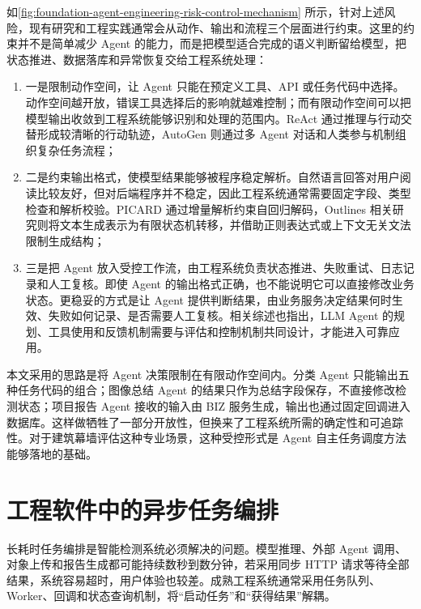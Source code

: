 如\cref{fig:foundation-agent-engineering-risk-control-mechanism} 所示，针对上述风险，现有研究和工程实践通常会从动作、输出和流程三个层面进行约束。这里的约束并不是简单减少 Agent 的能力，而是把模型适合完成的语义判断留给模型，把状态推进、数据落库和异常恢复交给工程系统处理：

\begin{enumerate}
  \item 一是限制动作空间，让 Agent 只能在预定义工具、API 或任务代码中选择。动作空间越开放，错误工具选择后的影响就越难控制；而有限动作空间可以把模型输出收敛到工程系统能够识别和处理的范围内。ReAct 通过推理与行动交替形成较清晰的行动轨迹，AutoGen 则通过多 Agent 对话和人类参与机制组织复杂任务流程\cite{yao2023react,wu2023autogen}；
  \item 二是约束输出格式，使模型结果能够被程序稳定解析。自然语言回答对用户阅读比较友好，但对后端程序并不稳定，因此工程系统通常需要固定字段、类型检查和解析校验。PICARD 通过增量解析约束自回归解码，Outlines 相关研究则将文本生成表示为有限状态机转移，并借助正则表达式或上下文无关文法限制生成结构\cite{scholak2021picard,willard2023efficient}；
  \item 三是把 Agent 放入受控工作流，由工程系统负责状态推进、失败重试、日志记录和人工复核。即使 Agent 的输出格式正确，也不能说明它可以直接修改业务状态。更稳妥的方式是让 Agent 提供判断结果，由业务服务决定结果何时生效、失败如何记录、是否需要人工复核。相关综述也指出，LLM Agent 的规划、工具使用和反馈机制需要与评估和控制机制共同设计，才能进入可靠应用\cite{wang2023llmagents}。
\end{enumerate}

本文采用的思路是将 Agent 决策限制在有限动作空间内。分类 Agent 只能输出五种任务代码的组合；图像总结 Agent 的结果只作为总结字段保存，不直接修改检测状态；项目报告 Agent 接收的输入由 BIZ 服务生成，输出也通过固定回调进入数据库。这样做牺牲了一部分开放性，但换来了工程系统所需的确定性和可追踪性。对于建筑幕墙评估这种专业场景，这种受控形式是 Agent 自主任务调度方法能够落地的基础。

\section{工程软件中的异步任务编排}
\label{sec:foundation-engineering-software-asynchronous-task-orchestration}

长耗时任务编排是智能检测系统必须解决的问题。模型推理、外部 Agent 调用、对象上传和报告生成都可能持续数秒到数分钟，若采用同步 HTTP 请求等待全部结果，系统容易超时，用户体验也较差。成熟工程系统通常采用任务队列、Worker、回调和状态查询机制，将“启动任务”和“获得结果”解耦。

